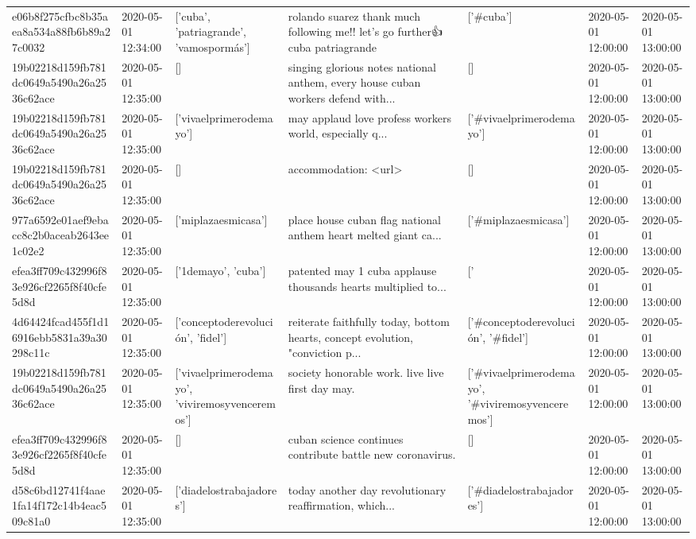 \begin{tabular}{lllllll}
e06b8f275cfbc8b35aea8a534a88fb6b89a27c0032 & 2020-05-01 12:34:00 & ['cuba', 'patriagrande', 'vamospormás'] & rolando suarez thank much🙏💕 following me!! let's go further👍 cuba patriagrande & ['#cuba'] & 2020-05-01 12:00:00 & 2020-05-01 13:00:00 \\
19b02218d159fb781dc0649a5490a26a2536c62ace & 2020-05-01 12:35:00 & [] & singing glorious notes national anthem, every house cuban workers defend with... & [] & 2020-05-01 12:00:00 & 2020-05-01 13:00:00 \\
19b02218d159fb781dc0649a5490a26a2536c62ace & 2020-05-01 12:35:00 & ['vivaelprimerodemayo'] & may applaud love profess workers world, especially q... & ['#vivaelprimerodemayo'] & 2020-05-01 12:00:00 & 2020-05-01 13:00:00 \\
19b02218d159fb781dc0649a5490a26a2536c62ace & 2020-05-01 12:35:00 & [] & accommodation: <url> & [] & 2020-05-01 12:00:00 & 2020-05-01 13:00:00 \\
977a6592e01aef9ebacc8c2b0aceab2643ee1c02e2 & 2020-05-01 12:35:00 & ['miplazaesmicasa'] & place house cuban flag national anthem heart melted giant ca... & ['#miplazaesmicasa'] & 2020-05-01 12:00:00 & 2020-05-01 13:00:00 \\
efea3ff709c432996f83e926cf2265f8f40cfe5d8d & 2020-05-01 12:35:00 & ['1demayo', 'cuba'] & patented may 1 cuba applause thousands hearts multiplied to... & ['#1demayo', '#cuba'] & 2020-05-01 12:00:00 & 2020-05-01 13:00:00 \\
4d64424fcad455f1d16916ebb5831a39a30298c11c & 2020-05-01 12:35:00 & ['conceptoderevolución', 'fidel'] & reiterate faithfully today, bottom hearts, concept evolution, "conviction p... & ['#conceptoderevolución', '#fidel'] & 2020-05-01 12:00:00 & 2020-05-01 13:00:00 \\
19b02218d159fb781dc0649a5490a26a2536c62ace & 2020-05-01 12:35:00 & ['vivaelprimerodemayo', 'viviremosyvenceremos'] & society honorable work. live live first day may. & ['#vivaelprimerodemayo', '#viviremosyvenceremos'] & 2020-05-01 12:00:00 & 2020-05-01 13:00:00 \\
efea3ff709c432996f83e926cf2265f8f40cfe5d8d & 2020-05-01 12:35:00 & [] & cuban science continues contribute battle new coronavirus. & [] & 2020-05-01 12:00:00 & 2020-05-01 13:00:00 \\
d58c6bd12741f4aae1fa14f172c14b4eac509c81a0 & 2020-05-01 12:35:00 & ['diadelostrabajadores'] & today another day revolutionary reaffirmation, which... & ['#diadelostrabajadores'] & 2020-05-01 12:00:00 & 2020-05-01 13:00:00 \\

\end{tabular}

